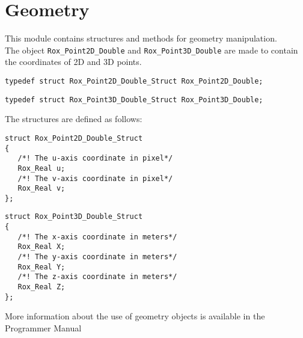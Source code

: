 \section{Geometry}
\label{sec:geometry}

This module contains structures and methods for geometry manipulation. \\

The object \lstinline$Rox_Point2D_Double$ and \lstinline$Rox_Point3D_Double$ are made to contain the coordinates of 2D and 3D points.

\begin{lstlisting}
typedef struct Rox_Point2D_Double_Struct Rox_Point2D_Double;
\end{lstlisting}

\begin{lstlisting}
typedef struct Rox_Point3D_Double_Struct Rox_Point3D_Double;
\end{lstlisting}

The structures are defined as follows:

\begin{lstlisting}
struct Rox_Point2D_Double_Struct
{
   /*! The u-axis coordinate in pixel*/
   Rox_Real u;
   /*! The v-axis coordinate in pixel*/
   Rox_Real v;
};
\end{lstlisting}

\begin{lstlisting}
struct Rox_Point3D_Double_Struct
{
   /*! The x-axis coordinate in meters*/
   Rox_Real X;
   /*! The y-axis coordinate in meters*/
   Rox_Real Y;
   /*! The z-axis coordinate in meters*/
   Rox_Real Z;
};
\end{lstlisting}

More information about the use of geometry objects is available in the Programmer Manual
